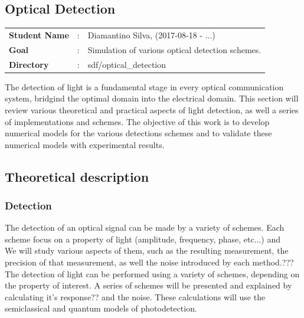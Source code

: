 \begin{bibunit}[plain]

\clearpage
\section{Optical Detection}

\begin{tcolorbox}	
\begin{tabular}{p{2.75cm} p{0.2cm} p{10.5cm}}
\textbf{Student Name}  &:& Diamantino Silva, (2017-08-18 - ...)\\
\textbf{Goal}          &:& Simulation of various optical detection schemes.\\
\textbf{Directory}     &:& sdf/optical\_detection
\end{tabular}
\end{tcolorbox}
%
\vspace{2em}
%
The detection of light is a fundamental stage in every optical communication system, bridgind the optimal domain into the electrical domain. This section will review various theoretical and practical aspects of light detection, as well a series of implementations and schemes.
The objective of this work is to develop numerical models for the various detections schemes and to validate these numerical models with experimental results.\\
%
%
\subsection{Theoretical description}
\label{subsec:intro}

\subsubsection{Detection}
\label{sec:schemes}

The detection of an optical signal can be made by a variety of schemes. Each scheme focus on a property of light (amplitude, frequency, phase, etc...) and 
\\
We will study various aspects of them, such as the resulting measurement, the precision of that measurement, as well the noise introduced by each method.???
\\
The detection of light can be performed using a variety of schemes, depending on the property of interest. A series of schemes will be presented and explained by calculating it's response?? and the noise. These calculations will use the semiclassical and quantum models of photodetection.





\end{bibunit}

